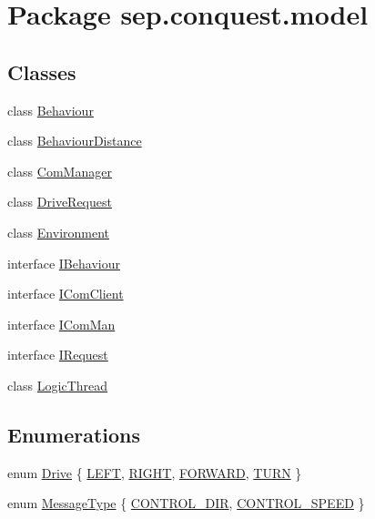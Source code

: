 \hypertarget{namespacesep_1_1conquest_1_1model}{
\section{Package sep.conquest.model}
\label{namespacesep_1_1conquest_1_1model}
}
\subsection*{Classes}
\begin{DoxyCompactItemize}
\item 
class \hyperlink{classsep_1_1conquest_1_1model_1_1_behaviour}{Behaviour}
\item 
class \hyperlink{classsep_1_1conquest_1_1model_1_1_behaviour_distance}{BehaviourDistance}
\item 
class \hyperlink{classsep_1_1conquest_1_1model_1_1_com_manager}{ComManager}
\item 
class \hyperlink{classsep_1_1conquest_1_1model_1_1_drive_request}{DriveRequest}
\item 
class \hyperlink{classsep_1_1conquest_1_1model_1_1_environment}{Environment}
\item 
interface \hyperlink{interfacesep_1_1conquest_1_1model_1_1_i_behaviour}{IBehaviour}
\item 
interface \hyperlink{interfacesep_1_1conquest_1_1model_1_1_i_com_client}{IComClient}
\item 
interface \hyperlink{interfacesep_1_1conquest_1_1model_1_1_i_com_man}{IComMan}
\item 
interface \hyperlink{interfacesep_1_1conquest_1_1model_1_1_i_request}{IRequest}
\item 
class \hyperlink{classsep_1_1conquest_1_1model_1_1_logic_thread}{LogicThread}
\end{DoxyCompactItemize}
\subsection*{Enumerations}
\begin{DoxyCompactItemize}
\item 
enum \hyperlink{namespacesep_1_1conquest_1_1model_ad9908b97350fd824462db2d10c17794c}{Drive} \{ \hyperlink{namespacesep_1_1conquest_1_1model_ad9908b97350fd824462db2d10c17794c}{LEFT}, 
\hyperlink{namespacesep_1_1conquest_1_1model_ad9908b97350fd824462db2d10c17794c}{RIGHT}, 
\hyperlink{namespacesep_1_1conquest_1_1model_ad9908b97350fd824462db2d10c17794c}{FORWARD}, 
\hyperlink{namespacesep_1_1conquest_1_1model_ad9908b97350fd824462db2d10c17794c}{TURN}
 \}
\item 
enum \hyperlink{namespacesep_1_1conquest_1_1model_a9d4115ef068e2fe4bc233f43008aa095}{MessageType} \{ \hyperlink{namespacesep_1_1conquest_1_1model_a9d4115ef068e2fe4bc233f43008aa095}{CONTROL\_\-DIR}, 
\hyperlink{namespacesep_1_1conquest_1_1model_a9d4115ef068e2fe4bc233f43008aa095}{CONTROL\_\-SPEED}
 \}
\end{DoxyCompactItemize}


